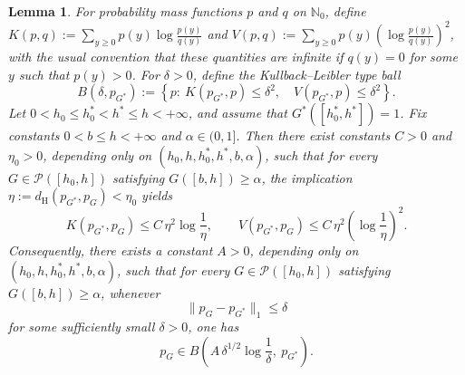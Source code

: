 \documentclass[twoside,12pt]{article}
\newtheorem{lem}[thm]{Lemma}
\begin{document}
\begin{lem}\label{lem:Poisson_WS}
For probability mass functions $p$ and $q$ on $\mathbb N_0$, define $K(p,q):=\sum_{y\ge 0}p(y)\log\frac{p(y)}{q(y)}$ and $V(p,q):=\sum_{y\ge 0}p(y)\left(\log\frac{p(y)}{q(y)}\right)^2$, with the usual convention that these quantities are infinite if $q(y)=0$ for some $y$ such that $p(y)>0$. For $\delta>0$, define the Kullback--Leibler type ball
\begin{displaymath}
B(\delta,p_{G^\ast}):=\left\{p:\ K(p_{G^\ast},p)\le \delta^2,\quad V(p_{G^\ast},p)\le \delta^2\right\}.
\end{displaymath}
Let $0<h_0\le h_0^\ast<h^\ast\le h<+\infty$, and assume that $G^\ast([h_0^\ast,h^\ast])=1$. Fix constants $0<b\le h<+\infty$ and $\alpha\in(0,1]$. Then there exist constants $C>0$ and $\eta_0>0$, depending only on $(h_0,h,h_0^\ast,h^\ast,b,\alpha)$, such that for every $G\in\mathcal P([h_0,h])$ satisfying $G([b,h])\ge \alpha$, the implication
$\eta:=d_{\mathrm H}(p_{G^\ast},p_G)<\eta_0$ yields
\begin{displaymath}
K(p_{G^\ast},p_G)\le C\,\eta^2\log\frac{1}{\eta},\qquad V(p_{G^\ast},p_G)\le C\,\eta^2\left(\log\frac{1}{\eta}\right)^2.
\end{displaymath}
Consequently, there exists a constant $A>0$, depending only on $(h_0,h,h_0^\ast,h^\ast,b,\alpha)$, such that for every $G\in\mathcal P([h_0,h])$ satisfying $G([b,h])\ge \alpha$, whenever
\begin{displaymath}
\|p_G-p_{G^\ast}\|_1\le \delta
\end{displaymath}
for some sufficiently small $\delta>0$, one has
\begin{displaymath}
p_G\in B\!\left(A\,\delta^{1/2}\log\frac{1}{\delta},\ p_{G^\ast}\right).
\end{displaymath}
\end{lem}
\end{document}
